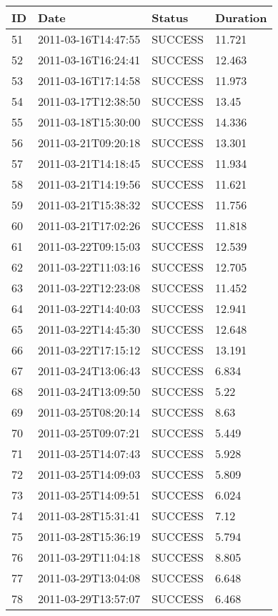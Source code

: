 \begin{tabularx}{\textwidth}{p{1cm} p{3cm} p{2cm} X}
 \toprule
 \textbf{ID} & \textbf{Date} & \textbf{Status} & \textbf{Duration} \\ 
 \toprule
 51 & 2011-03-16T14:47:55 & SUCCESS & 11.721 \\
 52 & 2011-03-16T16:24:41 & SUCCESS & 12.463 \\
 53 & 2011-03-16T17:14:58 & SUCCESS & 11.973 \\
 54 & 2011-03-17T12:38:50 & SUCCESS & 13.45 \\
 55 & 2011-03-18T15:30:00 & SUCCESS & 14.336 \\
 56 & 2011-03-21T09:20:18 & SUCCESS & 13.301 \\
 57 & 2011-03-21T14:18:45 & SUCCESS & 11.934 \\
 58 & 2011-03-21T14:19:56 & SUCCESS & 11.621 \\
 59 & 2011-03-21T15:38:32 & SUCCESS & 11.756 \\
 60 & 2011-03-21T17:02:26 & SUCCESS & 11.818 \\
 61 & 2011-03-22T09:15:03 & SUCCESS & 12.539 \\
 62 & 2011-03-22T11:03:16 & SUCCESS & 12.705 \\
 63 & 2011-03-22T12:23:08 & SUCCESS & 11.452 \\
 64 & 2011-03-22T14:40:03 & SUCCESS & 12.941 \\
 65 & 2011-03-22T14:45:30 & SUCCESS & 12.648 \\
 66 & 2011-03-22T17:15:12 & SUCCESS & 13.191 \\
 67 & 2011-03-24T13:06:43 & SUCCESS & 6.834 \\
 68 & 2011-03-24T13:09:50 & SUCCESS & 5.22 \\
 69 & 2011-03-25T08:20:14 & SUCCESS & 8.63 \\
 70 & 2011-03-25T09:07:21 & SUCCESS & 5.449 \\
 71 & 2011-03-25T14:07:43 & SUCCESS & 5.928 \\
 72 & 2011-03-25T14:09:03 & SUCCESS & 5.809 \\
 73 & 2011-03-25T14:09:51 & SUCCESS & 6.024 \\
 74 & 2011-03-28T15:31:41 & SUCCESS & 7.12 \\
 75 & 2011-03-28T15:36:19 & SUCCESS & 5.794 \\
 76 & 2011-03-29T11:04:18 & SUCCESS & 8.805 \\
 77 & 2011-03-29T13:04:08 & SUCCESS & 6.648 \\
 78 & 2011-03-29T13:57:07 & SUCCESS & 6.468 \\

\end{tabularx}
